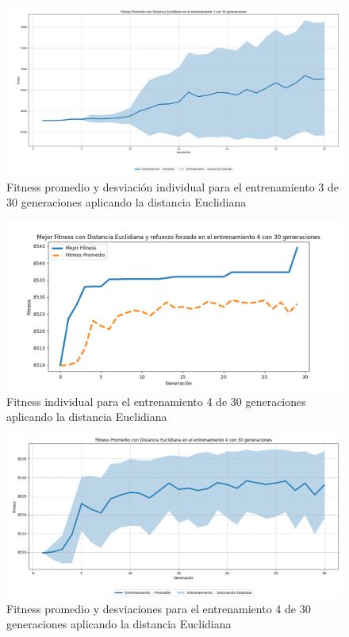 \documentclass[conference]{IEEEtran}
\begin{document}
\begin{figure}[H]
    \centering
    \includegraphics[width=0.9\linewidth]{Euclidiana/Fitness_individual_30/Fitness_3_Eucli_30Gen_Sombra.png}
    \caption{Fitness promedio y desviación individual para el entrenamiento 3 de 30 generaciones aplicando la distancia Euclidiana}
    \label{fig:Fitnes_ecu_3_30_inv_sombra}
\end{figure}


\begin{figure}[H]
    \centering
    \includegraphics[width=0.9 \linewidth]{Euclidiana/Fitness_individual_30/Fitness_4_Eucli_30Gen.png}
    \caption{Fitness individual para el entrenamiento 4 de 30 generaciones aplicando la distancia Euclidiana}
    \label{fig:eucli_4_30}
\end{figure}
\begin{figure}[H]
    \centering
    \includegraphics[width=0.9 \linewidth]{Euclidiana/Fitness_individual_30/Fitness_4_Eucli_30Gen_Sombra.png}
    \caption{Fitness promedio y desviaciones para el entrenamiento 4 de 30 generaciones aplicando la distancia Euclidiana}
    \label{fig:eucli_4_30_sombra}
\end{figure}
\end{document}
